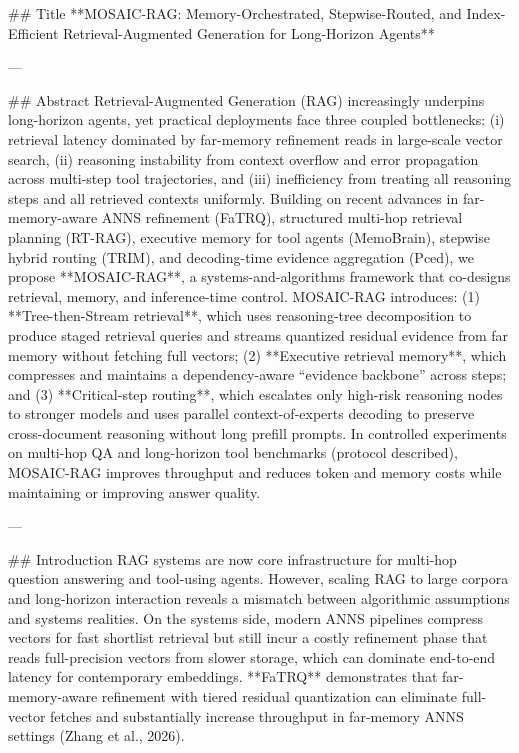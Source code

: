 ## Title  
**MOSAIC-RAG: Memory-Orchestrated, Stepwise-Routed, and Index-Efficient Retrieval-Augmented Generation for Long-Horizon Agents**

---

## Abstract  
Retrieval-Augmented Generation (RAG) increasingly underpins long-horizon agents, yet practical deployments face three coupled bottlenecks: (i) retrieval latency dominated by far-memory refinement reads in large-scale vector search, (ii) reasoning instability from context overflow and error propagation across multi-step tool trajectories, and (iii) inefficiency from treating all reasoning steps and all retrieved contexts uniformly. Building on recent advances in far-memory-aware ANNS refinement (FaTRQ), structured multi-hop retrieval planning (RT-RAG), executive memory for tool agents (MemoBrain), stepwise hybrid routing (TRIM), and decoding-time evidence aggregation (Pced), we propose **MOSAIC-RAG**, a systems-and-algorithms framework that co-designs retrieval, memory, and inference-time control. MOSAIC-RAG introduces: (1) **Tree-then-Stream retrieval**, which uses reasoning-tree decomposition to produce staged retrieval queries and streams quantized residual evidence from far memory without fetching full vectors; (2) **Executive retrieval memory**, which compresses and maintains a dependency-aware “evidence backbone” across steps; and (3) **Critical-step routing**, which escalates only high-risk reasoning nodes to stronger models and uses parallel context-of-experts decoding to preserve cross-document reasoning without long prefill prompts. In controlled experiments on multi-hop QA and long-horizon tool benchmarks (protocol described), MOSAIC-RAG improves throughput and reduces token and memory costs while maintaining or improving answer quality.  

---

## Introduction  
RAG systems are now core infrastructure for multi-hop question answering and tool-using agents. However, scaling RAG to large corpora and long-horizon interaction reveals a mismatch between algorithmic assumptions and systems realities. On the systems side, modern ANNS pipelines compress vectors for fast shortlist retrieval but still incur a costly refinement phase that reads full-precision vectors from slower storage, which can dominate end-to-end latency for contemporary embeddings. **FaTRQ** demonstrates that far-memory-aware refinement with tiered residual quantization can eliminate full-vector fetches and substantially increase throughput in far-memory ANNS settings (Zhang et al., 2026).  

